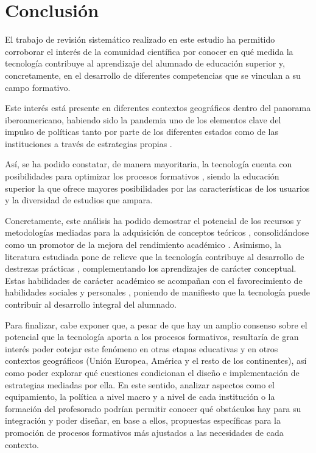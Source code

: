 \section{Conclusión}\label{sec-conclusión}

El trabajo de revisión sistemático realizado en este estudio ha
permitido corroborar el interés de la comunidad científica por conocer
en qué medida la tecnología contribuye al aprendizaje del alumnado de
educación superior y, concretamente, en el desarrollo de diferentes
competencias que se vinculan a su campo formativo.

Este interés está presente en diferentes contextos geográficos dentro
del panorama iberoamericano, habiendo sido la pandemia uno de los
elementos clave del impulso de políticas tanto por parte de los
diferentes estados \cite{marinsuelves2023} como de las
instituciones a través de estrategias propias \cite{colomo2023}.

Así, se ha podido constatar, de manera mayoritaria, la tecnología cuenta
con posibilidades para optimizar los procesos formativos \cite{cuevas2022}, siendo la educación superior la que ofrece mayores posibilidades
por las características de los usuarios y la diversidad de estudios que
ampara.

Concretamente, este análisis ha podido demostrar el potencial de los
recursos y metodologías mediadas para la adquisición de conceptos
teóricos \cite{cabrera2023}, consolidándose como un promotor de la
mejora del rendimiento académico \cite{davila2023}. Asimismo, la
literatura estudiada pone de relieve que la tecnología contribuye al
desarrollo de destrezas prácticas \cite{gabarda2021b,perez2023}, complementando los aprendizajes de carácter conceptual. Estas
habilidades de carácter académico se acompañan con el favorecimiento de
habilidades sociales \cite{garcia2022,guerrero2023} y
personales \cite{cordero2021,marques2023}, poniendo
de manifiesto que la tecnología puede contribuir al desarrollo integral
del alumnado.

Para finalizar, cabe exponer que, a pesar de que hay un amplio consenso
sobre el potencial que la tecnología aporta a los procesos formativos,
resultaría de gran interés poder cotejar este fenómeno en otras etapas
educativas y en otros contextos geográficos (Unión Europea, América y el
resto de los continentes), así como poder explorar qué cuestiones
condicionan el diseño e implementación de estrategias mediadas por ella.
En este sentido, analizar aspectos como el equipamiento, la política a
nivel macro y a nivel de cada institución o la formación del profesorado
podrían permitir conocer qué obstáculos hay para su integración y poder
diseñar, en base a ellos, propuestas específicas para la promoción de
procesos formativos más ajustados a las necesidades de cada contexto.
